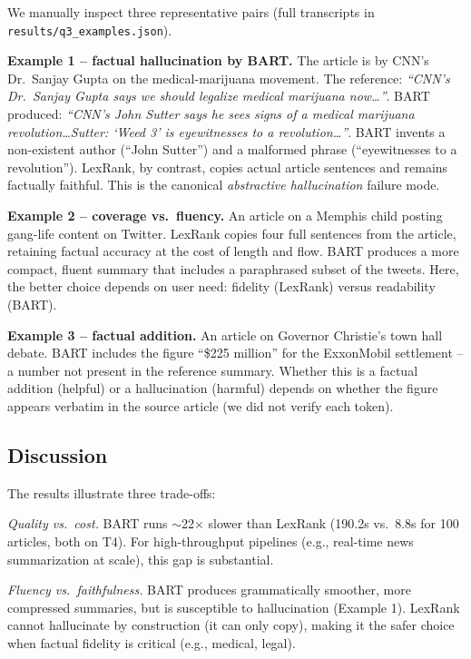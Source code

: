 \documentclass[11pt,a4paper]{article}
\begin{document}
We manually inspect three representative pairs (full transcripts in \texttt{results/q3\_examples.json}).

\textbf{Example 1 -- factual hallucination by BART.} The article is by CNN's Dr.\ Sanjay Gupta on the medical-marijuana movement. The reference: \textit{``CNN's Dr.\ Sanjay Gupta says we should legalize medical marijuana now\dots''}. BART produced: \textit{``CNN's John Sutter says he sees signs of a medical marijuana revolution\dots Sutter: `Weed 3' is eyewitnesses to a revolution\dots''}. BART invents a non-existent author (``John Sutter'') and a malformed phrase (``eyewitnesses to a revolution''). LexRank, by contrast, copies actual article sentences and remains factually faithful. This is the canonical \emph{abstractive hallucination} failure mode.

\textbf{Example 2 -- coverage vs.\ fluency.} An article on a Memphis child posting gang-life content on Twitter. LexRank copies four full sentences from the article, retaining factual accuracy at the cost of length and flow. BART produces a more compact, fluent summary that includes a paraphrased subset of the tweets. Here, the better choice depends on user need: fidelity (LexRank) versus readability (BART).

\textbf{Example 3 -- factual addition.} An article on Governor Christie's town hall debate. BART includes the figure ``\$225 million'' for the ExxonMobil settlement -- a number not present in the reference summary. Whether this is a factual addition (helpful) or a hallucination (harmful) depends on whether the figure appears verbatim in the source article (we did not verify each token).

\subsection{Discussion}

The results illustrate three trade-offs:

\textit{Quality vs.\ cost.} BART runs $\sim$22$\times$ slower than LexRank (190.2s vs.\ 8.8s for 100 articles, both on T4). For high-throughput pipelines (e.g., real-time news summarization at scale), this gap is substantial.

\textit{Fluency vs.\ faithfulness.} BART produces grammatically smoother, more compressed summaries, but is susceptible to hallucination (Example 1). LexRank cannot hallucinate by construction (it can only copy), making it the safer choice when factual fidelity is critical (e.g., medical, legal).
\end{document}
